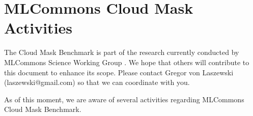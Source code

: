 \documentclass[sigplan,screen]{acmart}
\begin{document}

\maketitle


\section{MLCommons Cloud Mask Activities}

\nocite{las-2023-ai-workflow} %

The Cloud Mask Benchmark is part of the research currently conducted by MLCommons \cite{Farrell2021MLPerfHA} Science Working Group \cite{www-mlcommons-science-github}. 
We hope that others will contribute to this 
document to enhance its scope. Please contact Gregor von Laszewski (laszewski@gmail.com) 
so that we can coordinate with you.

As of this moment, we are aware of several activities regarding MLCommons Cloud Mask Benchmark.
\end{document}
